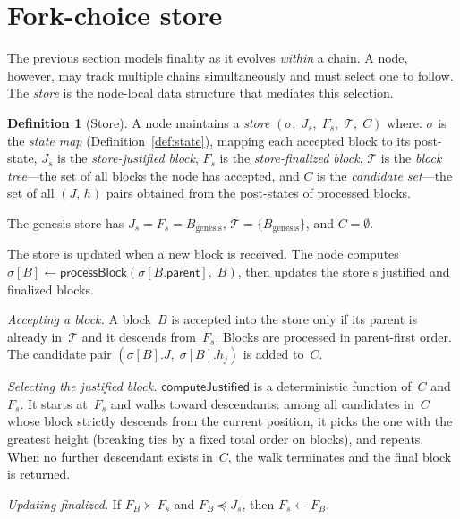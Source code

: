 \ifx\litemode\undefined\documentclass{article}\fi
\newcommand{\parent}{\mathsf{parent}}
\theoremstyle{plain}
\theoremstyle{definition}
\newtheorem{definition}[theorem]{Definition}
\theoremstyle{remark}
\begin{document}
\section{Fork-choice store}

The previous section models finality as it evolves \emph{within} a chain.
A node, however, may track multiple chains simultaneously and must select one to follow.
The \emph{store} is the node-local data structure that mediates this selection.

\begin{definition}[Store]\label{def:store}
A node maintains a \emph{store} $(\sigma,\; J_s,\; F_s,\; \mathcal{T},\; C)$ where:
$\sigma$ is the \emph{state map} (Definition~\ref{def:state}), mapping each accepted block to its post-state,
$J_s$ is the \emph{store-justified block},
$F_s$ is the \emph{store-finalized block},
$\mathcal{T}$ is the \emph{block tree}---the set of all blocks the node has accepted,
and $C$ is the \emph{candidate set}---the set of all $(J,\, h)$ pairs obtained from the post-states of processed blocks.

The genesis store has $J_s = F_s = B_{\mathrm{genesis}}$, $\mathcal{T} = \{B_{\mathrm{genesis}}\}$, and $C = \emptyset$.
\end{definition}

The store is updated when a new block is received.
The node computes $\sigma[B] \gets \textsf{processBlock}(\sigma[B.\parent],\; B)$, then updates the store's justified and finalized blocks.

\emph{Accepting a block.}
A block~$B$ is accepted into the store only if its parent is already in~$\mathcal{T}$ and it descends from~$F_s$.
Blocks are processed in parent-first order.
The candidate pair $(\sigma[B].J,\; \sigma[B].h_j)$ is added to~$C$.

\emph{Selecting the justified block.}
$\textsf{computeJustified}$ is a deterministic function of~$C$ and~$F_s$.
It starts at~$F_s$ and walks toward descendants: among all candidates in~$C$ whose block strictly descends from the current position, it picks the one with the greatest height (breaking ties by a fixed total order on blocks), and repeats.
When no further descendant exists in~$C$, the walk terminates and the final block is returned.

\emph{Updating finalized.}
If $F_B \succ F_s$ and $F_B \preceq J_s$, then $F_s \gets F_B$.
\end{document}
